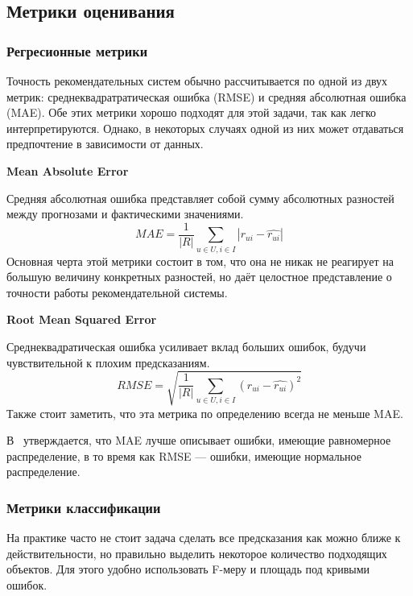\subsection{Метрики оценивания}\label{subsec:estimation_metrics}

\subsubsection{Регресионные метрики}
Точность рекомендательных систем обычно рассчитывается по одной из двух метрик: среднеквадратратическая ошибка (RMSE) и средняя абсолютная ошибка (MAE).
Обе этих метрики хорошо подходят для этой задачи, так как легко интерпретируются.
Однако, в некоторых случаях одной из них может отдаваться предпочтение в зависимости от данных.

\vspace{1em}
\textbf{Mean Absolute Error}

Средняя абсолютная ошибка представляет собой сумму абсолютных разностей между прогнозами и фактическими значениями. 
\begin{equation}\label{eq:mae}
MAE = \frac{1}{|R|} \sum_{u \in U , i \in I} |r_{ui} - \hat{r_{ui}}|
\end{equation}
Основная черта этой метрики состоит в том, что она не никак не реагирует на большую величину конкретных разностей, но даёт целостное представление о точности работы рекомендательной системы.

\vspace{1em}
\textbf{Root Mean Squared Error}

Среднеквадратическая ошибка усиливает вклад больших ошибок, будучи чувствительной к плохим предсказаниям.
\begin{equation}\label{eq:rmse}
RMSE = \sqrt{\frac{1}{|R|} \sum_{u \in U , i \in I} (r_{ui} - \hat{r_{ui}})^2}
\end{equation}
Также стоит заметить, что эта метрика по определению всегда не меньше MAE\@.

В~\cite{chai} утверждается, что MAE лучше описывает ошибки, имеющие равномерное распределение, в то время как RMSE --- ошибки, имеющие нормальное распределение.

\subsubsection{Метрики классификации}
На практике часто не стоит задача сделать все предсказания как можно ближе к действительности, но правильно выделить некоторое количество подходящих объектов.
Для этого удобно использовать F-меру и площадь под кривыми ошибок.

